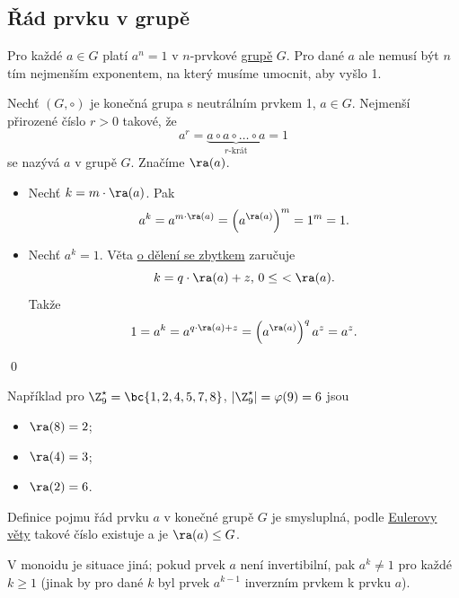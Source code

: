 \subsection{Řád prvku v grupě}\label{radPrvku}
Pro každé $a \in G$ platí $a^n = 1$ v $n$-prvkové \hyperref[grupa]{grupě} $G$. Pro dané $a$ ale nemusí být $n$ tím nejmenším exponentem, na který musíme umocnit, aby vyšlo 1.

Nechť $(G, \circ)$ je konečná grupa s neutrálním prvkem 1, $a \in G$. Nejmenší přirozené číslo $r > 0$ takové, že
\begin{equation}
	a^r = \underbrace{a \circ a \circ \dots \circ a}_{r\text{-krát}} = 1
\end{equation}
se nazývá  $a$ v grupě $G$. Značíme $\ra(a)$.\\
\dukaz
\vspace{-1em}
\begin{itemize}
	\item[$\Leftarrow$:] Nechť $k=m \cdot \ra(a)$. Pak
	\begin{equation}
		a^k = a^{m \cdot \ra(a)} = \left(a^{\ra(a)}\right)^m = 1^m = 1.
	\end{equation}
	\item[$\Rightarrow$:] Nechť $a^k = 1$. Věta \hyperref[delZbyt]{o dělení se zbytkem} zaručuje
	\begin{equation}
		k = q \cdot \ra(a) + z, \, 0 \leq \ < \ra(a).
	\end{equation}
	Takže
	\begin{equation}
		1= a^k = a^{q \cdot \ra(a) + z} = \left(a^{\ra(a)}\right)^q a^z = a^z.
	\end{equation}
\end{itemize}
\hspace{\fill}\qed

Například pro $\Z_9^\star = \bc{1,2,4,5,7,8}$, $|\Z_9^\star| = \varphi(9) = 6$ jsou
\vspace{-1em}
\begin{itemize}
	\item $\ra(8) = 2$;
	\item $\ra(4) = 3$;
	\item $\ra(2) = 6$.
\end{itemize}
Definice pojmu řád prvku $a$ v konečné grupě $G$ je smysluplná, podle \hyperref[euler]{Eulerovy věty} takové číslo existuje a je $\ra(a) \leq G$.

V monoidu je situace jiná; pokud prvek $a$ není invertibilní, pak $a^k \not= 1$ pro každé $k \geq 1$ (jinak by pro dané $k$ byl prvek $a^{k-1}$ inverzním prvkem k prvku $a$).

